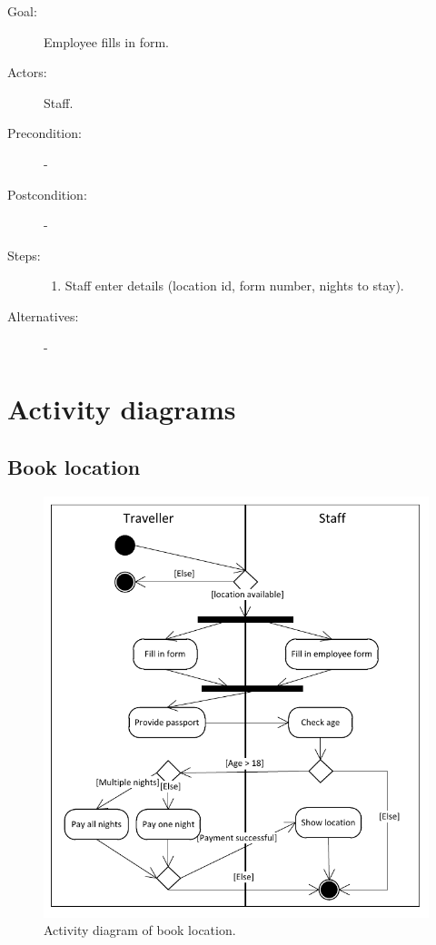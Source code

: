 \begin{description}
\item[Goal:] Employee fills in form.
\item[Actors:] Staff.
\item[Precondition:] -
\item[Postcondition:] -
\item[Steps:] 
\begin{enumerate}
\item Staff enter details (location id, form number, nights to stay).
\end{enumerate}

\item[Alternatives:] -
\end{description}

\section{Activity diagrams}

\subsection{Book location}

\begin{figure}[H]
\begin{centering}
\includegraphics[width=\textwidth]{gfx/activity_diagram_book.pdf} 
\end{centering}
\caption{Activity diagram of book location.}
\label{fig:actdiag_book}
\end{figure}

